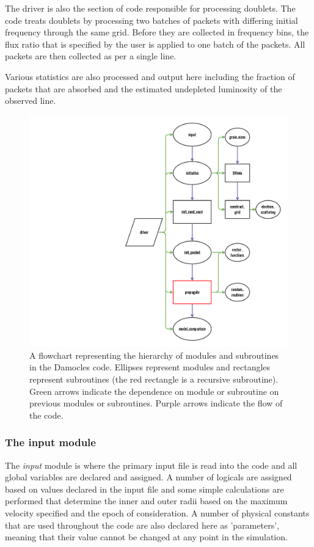 		The driver is also the section of code responsible for processing doublets.  The code treats doublets by processing two batches of packets with differing initial frequency through the same grid.  Before they are collected in frequency bins, the flux ratio that is specified by the user is applied to one batch of the packets.  All packets are then collected as per a single line. 
		
		Various statistics are also processed and output here including the fraction of packets that are absorbed and the estimated undepleted luminosity of the observed line. 
		

	\begin{figure}
	\centering
	\includegraphics[scale=0.18, trim=430mm 20mm 30mm 25mm]{chapters/chapter2/code_modules_flowchart.png}
	\caption{A flowchart representing the hierarchy of modules and subroutines in the Damocles code.  Ellipses represent modules and rectangles represent subroutines (the red rectangle is a recursive subroutine).  Green arrows indicate the dependence on module or subroutine on previous modules or subroutines.  Purple arrows indicate the flow of the code.}
	\label{fig:flowchart_mods}
	\end{figure}

		
		\subsubsection{The input module}
		The \textit{input} module is where the primary input file is read into the code and all global variables are declared and assigned.  A number of logicals are assigned based on values declared in the input file and some simple calculations are performed that determine the inner and outer radii based on the maximum velocity specified and the epoch of consideration.  A number of physical constants that are used throughout the code are also declared here as 'parameters', meaning that their value cannot be changed at any point in the simulation.
		
